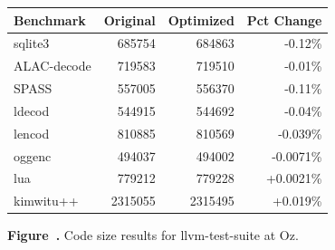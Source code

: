 \par\vspace{1.2em}

\begin{center}
{\normalfont\normalsize
\setlength{\tabcolsep}{5pt}
\renewcommand{\arraystretch}{1.08}
\begin{tabular}{@{}lrrr@{}}
\toprule
Benchmark & Original & Optimized & Pct Change \\
\midrule
sqlite3    & 685754  & 684863  & -0.12\% \\
ALAC-decode & 719583 & 719510  & -0.01\% \\
SPASS      & 557005  & 556370  & -0.11\% \\
ldecod     & 544915  & 544692  & -0.04\% \\
lencod     & 810885  & 810569  & -0.039\% \\
oggenc     & 494037  & 494002  & -0.0071\% \\
lua        & 779212  & 779228  & +0.0021\% \\
kimwitu++  & 2315055 & 2315495 & +0.019\% \\
\bottomrule
\end{tabular}
}
\end{center}

\vspace{0.12em}

\label{fig:figure10}

\begin{center}
\small\textbf{Figure~\thefigure.} Code size results for llvm-test-suite at Oz.
\end{center}

\par\vspace{1.2em}
